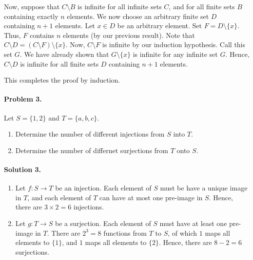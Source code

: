 \documentclass[10pt]{article}
\begin{document}
\begin{enumerate}
                Now, suppose that $C\setminus B$ is infinite for all infinite sets $C$, and for all finite sets $B$ containing exactly 
                $n$ elements. We now choose an arbitrary finite set $D$ containing $n + 1$ elements. Let $x\in D$ be an arbitrary element.
                Set $F = D\setminus\{x\}$. Thus, $F$ contains $n$ elements (by our previous result).
                Note that $C\setminus D = (C\setminus F)\setminus\{x\}$.
                Now, $C\setminus F$ is infinite by our induction hypothesis. Call this set $G$.
                We have already shown that $G\setminus\{x\}$ is infinite for any infinite set $G$. Hence,
                $C\setminus D$ is infinite for all finite sets $D$ containing $n + 1$ elements.

                This completes the proof by induction.
        \end{enumerate}

        \paragraph{Problem 3.} Let $S = \{1, 2\}$ and $T = \{a, b, c\}$.
        \begin{enumerate}
                \item Determine the number of different injections from $S$ into $T$.
                \item Determine the number of differnet surjections from $T$ onto $S$.
        \end{enumerate}
        \paragraph{Solution 3.}
        \begin{enumerate}
                \item Let $f\colon S \to T$ be an injection. Each element of $S$ must be have a unique image in $T$, 
                and each element of $T$ can have at most one pre-image in $S$. Hence, there are $3\times 2 = 6$ injections.

                \item Let $g\colon T \to S$ be a surjection. Each element of $S$ must have at least one pre-image in $T$.
                There are $2^3 = 8$ functions from $T$ to $S$, of which $1$ maps all elements to $\{1\}$, and $1$ maps all elements
                to $\{2\}$. Hence, there are $8 - 2 = 6$ surjections.
        \end{enumerate}
\end{document}
